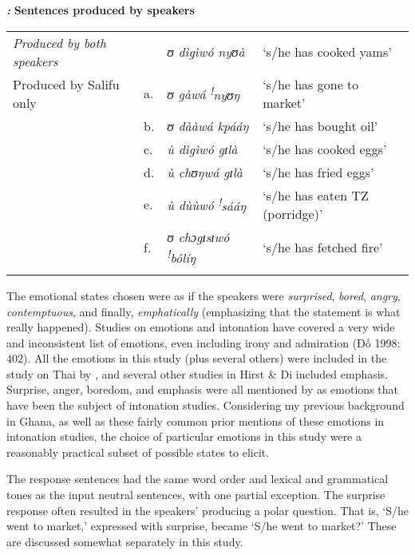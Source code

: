 \documentclass[output=paper]{langsci/langscibook}
\begin{document}
\emph{\textbf{\textup{:}}}\textbf{\textit{ }}\textbf{Sentences produced by speakers}\textbf{\textit{ }}

\begin{tabular}{llll}
\lsptoprule

\emph{\textup{Produced by both speakers}} &  & \textit{ʊ dìgìwó nyʊà        } & ‘s/he has cooked yams’\\
Produced by Salifu only & a. & \textit{ʊ gàwá }\textit{\textsuperscript{!}}\textit{nyʊŋ} & ‘s/he has gone to market’\\
& b. & \textit{ʊ dààwá kpááŋ} & ‘s/he has bought oil’\\
& c. & \textit{ù dìgìwó gɪlà} & ‘s/he has cooked eggs’\\
& d. & \textit{ù chʊŋwá gɪlà} & ‘s/he has fried eggs’\\
& e. & \textit{ù dùùwó }\textit{\textsuperscript{!}}\textit{sááŋ} & ‘s/he has eaten TZ (porridge)’\\
& f. & \textit{ʊ chɔgɪsɪwó }\textit{\textsuperscript{!}}\textit{bólíŋ} & ‘s/he has fetched fire’  \\
\lspbottomrule
\end{tabular}
The emotional states chosen were as if the speakers were \emph{surprised}, \emph{bored}, \emph{angry}, \emph{contemptuous}, and finally, \emph{emphatically} (emphasizing that the statement is what really happened). Studies on emotions and intonation have covered a very wide and inconsistent list of emotions, even including irony and admiration (Đố 1998: 402). All the emotions in this study (plus several others) were included in the study on Thai by \citet{Luksaneeyanawin1998}, and several other studies in Hirst \& Di\citet{Cristo1998} included emphasis. Surprise, anger, boredom, and emphasis were all mentioned by \citet{Ladd2008} as emotions that have been the subject of intonation studies. Considering my previous background in Ghana, as well as these fairly common prior mentions of these emotions in intonation studies, the choice of particular emotions in this study were a reasonably practical subset of possible states to elicit.

The response sentences had the same word order and lexical and grammatical tones as the input neutral sentences, with one partial exception. The surprise response often resulted in the speakers’ producing a polar question. That is, ‘S/he went to market,’ expressed with surprise, became ‘S/he went to market?’ These are discussed somewhat separately in this study. 
\end{document}
